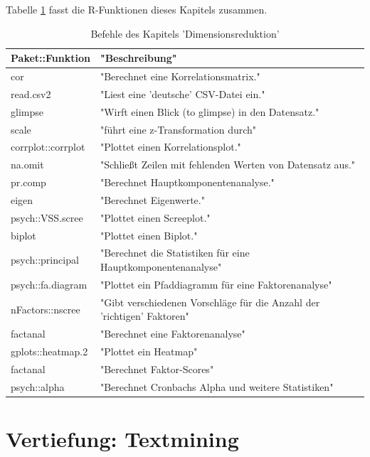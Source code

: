 \documentclass[12pt,ngerman,]{book}
\theoremstyle{definition}
\theoremstyle{definition}
\theoremstyle{remark}
\begin{document}
Tabelle \ref{tab:befehle-dimred} fasst die R-Funktionen dieses Kapitels
zusammen.

\begin{table}

\caption{\label{tab:befehle-dimred}Befehle des Kapitels 'Dimensionsreduktion'}
\centering
\begin{tabular}[t]{l|l}
\hline
Paket::Funktion & "Beschreibung"\\
\hline
cor & "Berechnet eine Korrelationsmatrix."\\
\hline
read.csv2 & "Liest eine 'deutsche' CSV-Datei ein."\\
\hline
glimpse & "Wirft einen Blick (to glimpse) in den Datensatz."\\
\hline
scale & "führt eine z-Transformation durch"\\
\hline
corrplot::corrplot & "Plottet einen Korrelationsplot."\\
\hline
na.omit & "Schließt Zeilen mit fehlenden Werten von Datensatz aus."\\
\hline
pr.comp & "Berechnet Hauptkomponentenanalyse."\\
\hline
eigen & "Berechnet Eigenwerte."\\
\hline
psych::VSS.scree & "Plottet einen Screeplot."\\
\hline
biplot & "Plottet einen Biplot."\\
\hline
psych::principal & "Berechnet die Statistiken für eine Hauptkomponentenanalyse"\\
\hline
psych::fa.diagram & "Plottet ein Pfaddiagramm für eine Faktorenanalyse"\\
\hline
nFactors::nscree & "Gibt verschiedenen Vorschläge für die Anzahl der 'richtigen' Faktoren"\\
\hline
factanal & "Berechnet eine Faktorenanalyse"\\
\hline
gplots::heatmap.2 & "Plottet ein Heatmap"\\
\hline
factanal & "Berechnet Faktor-Scores"\\
\hline
psych::alpha & "Berechnet Cronbachs Alpha und weitere Statistiken"\\
\hline
\end{tabular}
\end{table}

\chapter{Vertiefung: Textmining}\label{vertiefung-textmining}
\end{document}
